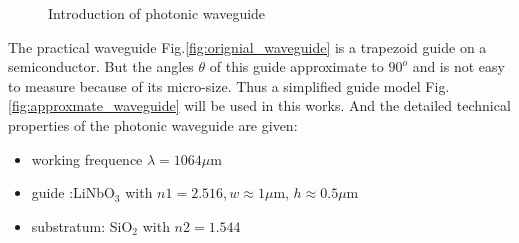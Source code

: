 \begin{figure}
\centering
{}
\hfill
{}
\caption{Introduction of  photonic waveguide}
\label{fig:photonic_waveguide}
\end{figure}
The practical waveguide Fig.\quad\ref{fig:orignial_waveguide} is a trapezoid guide on a semiconductor. But the angles $\theta$ of this guide approximate to $90^{o}$ and is not easy to measure because of its micro-size. Thus a simplified guide model Fig.\ref{fig:approxmate_waveguide} will be used in this works. And the detailed technical properties of the photonic waveguide are given:
\begin{itemize}
\item working frequence $\lambda=1064\mu$m
\item guide :LiNbO$_{3}$ with $n1=2.516, w\approx 1\mu$m, $h\approx 0.5 \mu$m
\item substratum: SiO$_{2}$ with $n2=1.544 $
\end{itemize}
